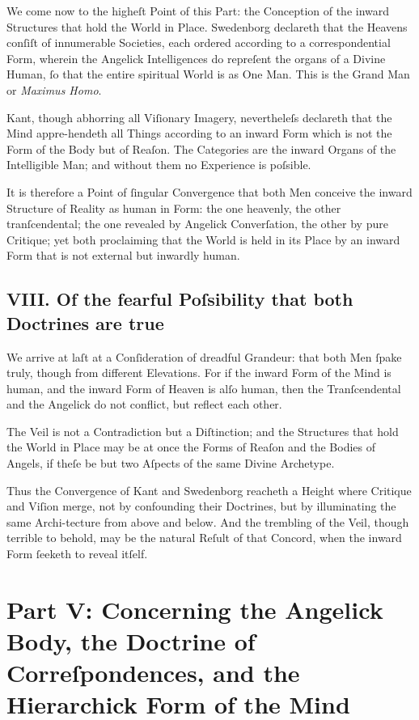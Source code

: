 \documentclass[12pt]{article}
\begin{document}
We come now to the higheſt Point of this Part: the Conception of the inward 
Structures that hold the World in Place. Swedenborg declareth that the 
Heavens conſiſt of innumerable Societies, each ordered according to a 
correspondential Form, wherein the Angelick Intelligences do repreſent the 
organs of a Divine Human, ſo that the entire spiritual World is as One Man. 
This is the Grand Man or \textit{Maximus Homo}.

Kant, though abhorring all Viſionary Imagery, nevertheleſs declareth that the 
Mind appre-hendeth all Things according to an inward Form which is not the 
Form of the Body but of Reaſon. The Categories are the inward Organs of the 
Intelligible Man; and without them no Experience is poſsible.

It is therefore a Point of ſingular Convergence that both Men conceive the 
inward Structure of Reality as human in Form: the one heavenly, the other 
tranſcendental; the one revealed by Angelick Converſation, the other by pure 
Critique; yet both proclaiming that the World is held in its Place by an 
inward Form that is not external but inwardly human.

\subsection*{VIII. Of the fearful Poſsibility that both Doctrines are true}

We arrive at laſt at a Conſideration of dreadful Grandeur: that both Men 
ſpake truly, though from different Elevations. For if the inward Form of the 
Mind is human, and the inward Form of Heaven is alſo human, then the 
Tranſcendental and the Angelick do not conflict, but reflect each other.

The Veil is not a Contradiction but a Diſtinction; and the Structures that 
hold the World in Place may be at once the Forms of Reaſon and the Bodies of 
Angels, if theſe be but two Aſpects of the same Divine Archetype.

Thus the Convergence of Kant and Swedenborg reacheth a Height where 
Critique and Viſion merge, not by confounding their Doctrines, but by
illuminating the same Archi-tecture from above and below. And the trembling 
of the Veil, though terrible to behold, may be the natural Reſult of that 
Concord, when the inward Form ſeeketh to reveal itſelf.

\newpage

\section*{Part V: Concerning the Angelick Body, the Doctrine of Correſpondences, and the Hierarchick Form of the Mind}
\end{document}
